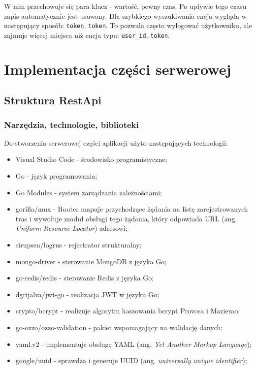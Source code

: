 W nim przechowuje się para klucz - wartość, pewny czas. Po upływie tego czasu zapis automatycznie jest usuwany.
Dla szybkiego wyszukiwania encja wygląda w następujący sposób: \texttt{token}, \texttt{token}. To pozwala często wylogować użytkowniku, ale zajmuje więcej miejsca niż encja typu: \texttt{user\_id}, \texttt{token}.

\section{Implementacja części serwerowej}
% 
\subsection{Struktura RestApi}
% 
\subsubsection{Narzędzia, technologie, biblioteki}
Do stworzenia serwerowej części aplikacji użyto następujących technologii:
\begin{itemize}
\item Visual Studio Code - środowisko programistyczne;
\item Go - język programowania;
\item Go Modules - system zarządzania zależnościami;
\item gorilla/mux - Router mapuje przychodzące żądania na listę zarejestrowanych tras i wywołuje moduł obsługi tego żądania, który odpowiada URL (ang. \textit{Uniform Resource Locator}) adresowi;
\item sirupsen/logrus - rejestrator strukturalny;
\item mongo-driver - sterowanie MongoDB z języka Go;
\item go-redis/redis - sterowanie Redis z języka Go;
\item dgrijalva/jwt-go - realizacja JWT w języku Go;
\item crypto/bcrypt - realizuje algorytm haszowania bcrypt Provosa i Mazierao;
\item go-ozzo/ozzo-validation - pakiet wspomagający na walidację danych;
\item yaml.v2 - implementuje obsługę YAML (ang. \textit{Yet Another Markup Language});
\item google/uuid - sprawdza i generuje UUID (ang. \textit{universally unique identifier});
\end{itemize}

% 
